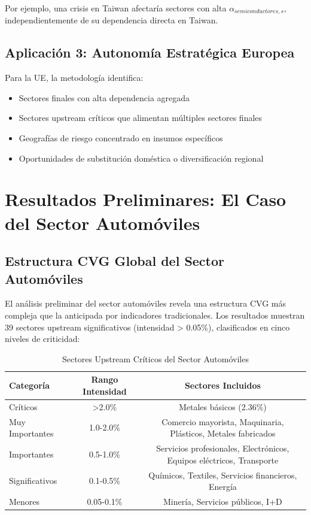 \documentclass[12pt,a4paper]{article}
\begin{document}
Por ejemplo, una crisis en Taiwan afectaría sectores con alta $\alpha_{semiconductores,s}$, independientemente de su dependencia directa en Taiwan.

\subsection{Aplicación 3: Autonomía Estratégica Europea}

Para la UE, la metodología identifica:
\begin{itemize}
    \item Sectores finales con alta dependencia agregada
    \item Sectores upstream críticos que alimentan múltiples sectores finales
    \item Geografías de riesgo concentrado en insumos específicos
    \item Oportunidades de substitución doméstica o diversificación regional
\end{itemize}

\section{Resultados Preliminares: El Caso del Sector Automóviles}

\subsection{Estructura CVG Global del Sector Automóviles}

El análisis preliminar del sector automóviles revela una estructura CVG más compleja que la anticipada por indicadores tradicionales. Los resultados muestran 39 sectores upstream significativos (intensidad > 0.05\%), clasificados en cinco niveles de criticidad:

\begin{table}[H]
\centering
\caption{Sectores Upstream Críticos del Sector Automóviles}
\begin{tabular}{@{}lcc@{}}
\toprule
Categoría & Rango Intensidad & Sectores Incluidos \\
\midrule
Críticos & >2.0\% & Metales básicos (2.36\%) \\
Muy Importantes & 1.0-2.0\% & Comercio mayorista, Maquinaria, Plásticos, Metales fabricados \\
Importantes & 0.5-1.0\% & Servicios profesionales, Electrónicos, Equipos eléctricos, Transporte \\
Significativos & 0.1-0.5\% & Químicos, Textiles, Servicios financieros, Energía \\
Menores & 0.05-0.1\% & Minería, Servicios públicos, I+D \\
\bottomrule
\end{tabular}
\end{table}
\end{document}
